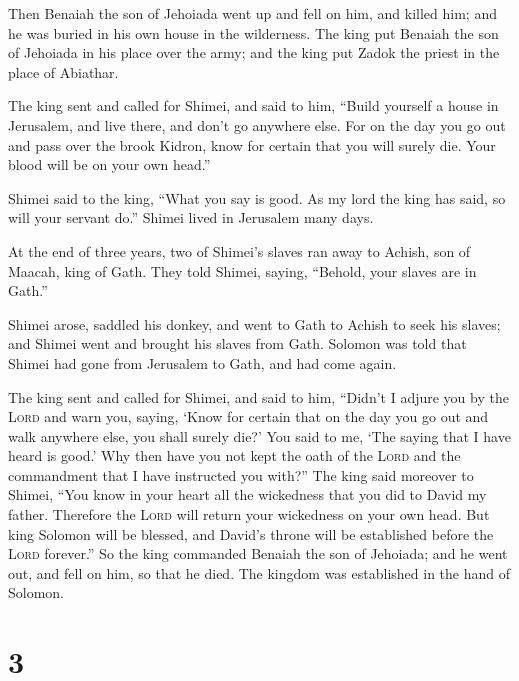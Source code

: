  Then Benaiah the son of Jehoiada went up and fell on
him, and killed him; and he was buried in his own house in the
wilderness.  The king put Benaiah the son of Jehoiada in
his place over the army; and the king put Zadok the priest in the place
of Abiathar.

 The king sent and called for Shimei, and said to him,
``Build yourself a house in Jerusalem, and live there, and don't go
anywhere else.  For on the day you go out and pass over
the brook Kidron, know for certain that you will surely die. Your blood
will be on your own head.''

 Shimei said to the king, ``What you say is good. As my
lord the king has said, so will your servant do.'' Shimei lived in
Jerusalem many days.

 At the end of three years, two of Shimei's slaves ran
away to Achish, son of Maacah, king of Gath. They told Shimei, saying,
``Behold, your slaves are in Gath.''

 Shimei arose, saddled his donkey, and went to Gath to
Achish to seek his slaves; and Shimei went and brought his slaves from
Gath.  Solomon was told that Shimei had gone from
Jerusalem to Gath, and had come again.

 The king sent and called for Shimei, and said to him,
``Didn't I adjure you by the \textsc{Lord} and warn you, saying, `Know
for certain that on the day you go out and walk anywhere else, you shall
surely die?' You said to me, `The saying that I have heard is good.'
 Why then have you not kept the oath of the \textsc{Lord}
and the commandment that I have instructed you with?'' 
The king said moreover to Shimei, ``You know in your heart all the
wickedness that you did to David my father. Therefore the \textsc{Lord}
will return your wickedness on your own head.  But king
Solomon will be blessed, and David's throne will be established before
the \textsc{Lord} forever.''  So the king commanded
Benaiah the son of Jehoiada; and he went out, and fell on him, so that
he died. The kingdom was established in the hand of Solomon.

\hypertarget{section-2}{%
\section{3}\label{section-2}}

